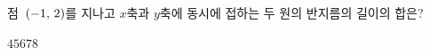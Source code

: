 점~$(-1,\mkern3mu 2)$를 지나고 $x$축과 $y$축에 동시에 접하는 두 원의 반지름의 길이의 합은?
\begin{choices32}{$4$}{$5$}{$6$}{$7$}{$8$}\end{choices32}
